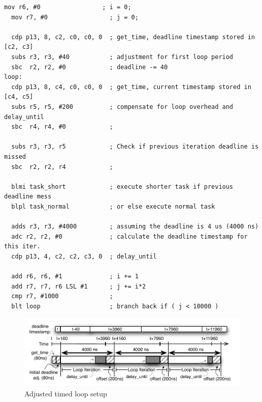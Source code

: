 \begin{lstlisting}[float=h, label=lst:timed_loop_compensate_adj,caption=Jitter adjusted timed loop ]
  mov r6, #0                 ; i = 0;
  mov r7, #0                 ; j = 0;
  
  cdp p13, 8, c2, c0, c0, 0  ; get_time, deadline timestamp stored in [c2, c3]
  subs r3, r3, #40           ; adjustment for first loop period 
  sbc  r2, r2, #0            ; deadline -= 40
loop:
  cdp p13, 8, c4, c0, c0, 0  ; get_time, current timestamp stored in [c4, c5]
  subs r5, r5, #200          ; compensate for loop overhead and delay_until 
  sbc  r4, r4, #0            ; 

  subs r3, r3, r5            ; Check if previous iteration deadline is missed
  sbc  r2, r2, r4            ; 

  blmi task_short            ; execute shorter task if previous deadline mess 
  blpl task_normal           ; or else execute normal task 
  
  adds r3, r3, #4000         ; assuming the deadline is 4 us (4000 ns)
  adc r2, r2, #0             ; calculate the deadline timestamp for this iter.
  cdp p13, 4, c2, c2, c3, 0  ; delay_until
	
  add r6, r6, #1             ; i += 1    
  add r7, r7, r6 LSL #1      ; j += i*2  
  cmp r7, #1000              ; 
  blt loop                   ; branch back if ( j < 10000 )
\end{lstlisting} 

\begin{figure}[h]
  \vspace{-3mm}
  \begin{center}
    \includegraphics[scale=.9]{figs/setup_loop_timing_adj}
  \end{center}
  \vspace{-3mm}
  \caption{Adjusted timed loop setup}
  \label{fig:setup_look_timing_adj}
\end{figure}

